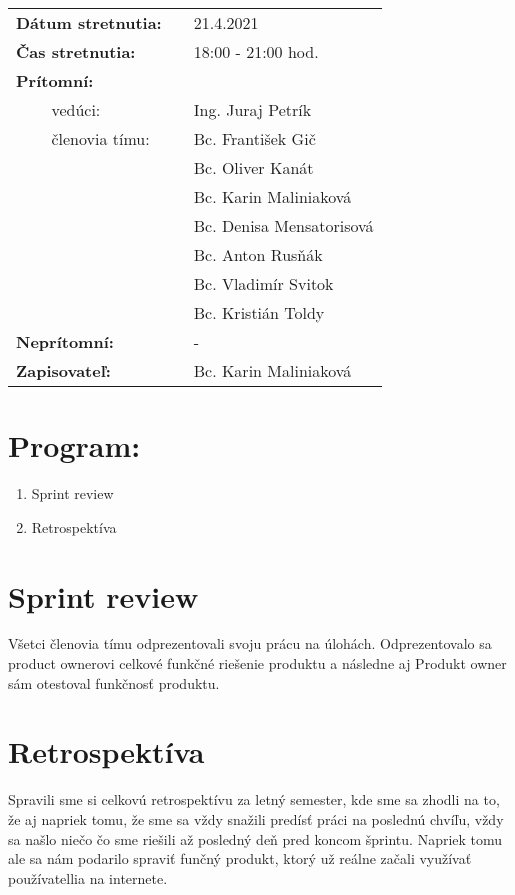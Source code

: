 \documentclass{article}
\begin{document}
    

    \begin{table}[h]
        \begin{tabular}{lllll}
            \multicolumn{3}{l}{\textbf{Dátum stretnutia:}} & & 21.4.2021 \\
            \multicolumn{3}{l}{\textbf{Čas stretnutia:}} & & 18:00 - 21:00 hod. \\
            \multicolumn{3}{l}{\textbf{Prítomní:}} \\
            & & vedúci: & & Ing. Juraj Petrík \\
            & & členovia tímu: & & Bc. František Gič  \\
            & & & & Bc. Oliver Kanát \\
            & & & & Bc. Karin Maliniaková \\
            & & & & Bc. Denisa Mensatorisová \\
            & & & & Bc. Anton Rusňák \\
            & & & & Bc. Vladimír Svitok \\
            & & & & Bc. Kristián Toldy \\
            \multicolumn{3}{l}{\textbf{Neprítomní:}} & & -\\
            \multicolumn{3}{l}{\textbf{Zapisovateľ:}} & & Bc. Karin Maliniaková \\
        \end{tabular}
        \label{tab:grades}
    \end{table}

    \section*{Program:}

    \begin{enumerate}
        \item Sprint review
        \item Retrospektíva
    \end{enumerate}

    \section*{Sprint review}

        \textnormal {Všetci členovia tímu odprezentovali svoju prácu na úlohách. Odprezentovalo sa product ownerovi celkové funkčné riešenie produktu a následne aj Produkt owner sám otestoval funkčnosť produktu.}


    \section*{Retrospektíva}
        \textnormal {Spravili sme si celkovú retrospektívu za letný semester, kde sme sa zhodli na to, že aj napriek tomu, že sme sa vždy snažili predísť práci na poslednú chvíľu, vždy sa našlo niečo čo sme riešili až posledný deň pred koncom šprintu. Napriek tomu ale sa nám podarilo spraviť funčný produkt, ktorý už reálne začali využívať používatellia na internete.}
        
\end{document}
